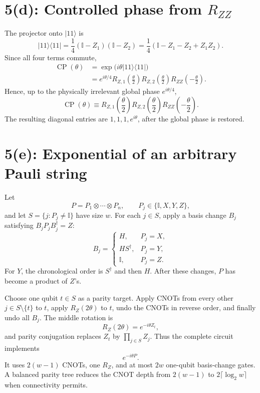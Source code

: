\documentclass[11pt]{article}
\newcommand{\ket}[1]{\lvert #1\rangle}
\newcommand{\bra}[1]{\langle #1\rvert}
\newcommand{\I}{\mathbb{I}}
\begin{document}
\section*{5(d): Controlled phase from \(R_{ZZ}\)}

The projector onto \(\ket{11}\) is
\[
 \ket{11}\!\bra{11}
 =\frac14(\I-Z_1)(\I-Z_2)
 =\frac14(\I-Z_1-Z_2+Z_1Z_2).
\]
Since all four terms commute,
\begin{align*}
\operatorname{CP}(\theta)
 &=\exp\bigl(i\theta\ket{11}\!\bra{11}\bigr)\\
 &=e^{i\theta/4}
   R_{Z,1}\left(\frac{\theta}{2}\right)
   R_{Z,2}\left(\frac{\theta}{2}\right)
   R_{ZZ}\left(-\frac{\theta}{2}\right).
\end{align*}
Hence, up to the physically irrelevant global phase \(e^{i\theta/4}\),
\[
\boxed{
\operatorname{CP}(\theta)
\equiv
R_{Z,1}\left(\frac{\theta}{2}\right)
R_{Z,2}\left(\frac{\theta}{2}\right)
R_{ZZ}\left(-\frac{\theta}{2}\right).
}
\]
The resulting diagonal entries are \(1,1,1,e^{i\theta}\), after the
global phase is restored.

\section*{5(e): Exponential of an arbitrary Pauli string}

Let
\[
 P=P_1\otimes\cdots\otimes P_n,\qquad
 P_j\in\{\I,X,Y,Z\},
\]
and let \(S=\{j:P_j\neq\I\}\) have size \(w\). For each \(j\in S\),
apply a basis change \(B_j\) satisfying \(B_jP_jB_j^\dagger=Z\):
\[
 B_j=
 \begin{cases}
 H,&P_j=X,\\
 HS^\dagger,&P_j=Y,\\
 \I,&P_j=Z.
 \end{cases}
\]
For \(Y\), the chronological order is \(S^\dagger\) and then \(H\).
After these changes, \(P\) has become a product of \(Z\)'s.

Choose one qubit \(t\in S\) as a parity target. Apply CNOTs from every
other \(j\in S\setminus\{t\}\) to \(t\), apply \(R_Z(2\theta)\) to
\(t\), undo the CNOTs in reverse order, and finally undo all \(B_j\).
The middle rotation is
\[
 R_Z(2\theta)=e^{-i\theta Z_t},
\]
and parity conjugation replaces \(Z_t\) by \(\prod_{j\in S}Z_j\).
Thus the complete circuit implements
\[
 \boxed{e^{-i\theta P}.}
\]
It uses \(2(w-1)\) CNOTs, one \(R_Z\), and at most \(2w\) one-qubit
basis-change gates. A balanced parity tree reduces the CNOT depth from
\(2(w-1)\) to \(2\lceil\log_2w\rceil\) when connectivity permits.
\end{document}
